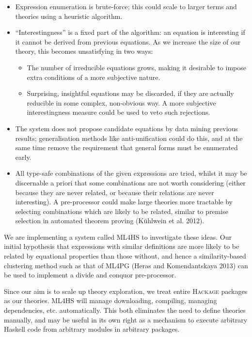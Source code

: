 \documentclass[]{article}
\providecommand{\tightlist}{%
  \setlength{\itemsep}{0pt}\setlength{\parskip}{0pt}}
\begin{document}
\begin{itemize}
\tightlist
\item
  Expression enumeration is brute-force; this could scale to larger
  terms and theories using a heuristic algorithm.
\item
  ``Interestingness'' is a fixed part of the algorithm: an equation is
  interesting if it cannot be derived from previous equations. As we
  increase the size of our theory, this becomes unsatisfying in two
  ways:

  \begin{itemize}
  \tightlist
  \item
    The number of irreducible equations grows, making it desirable to
    impose extra conditions of a more subjective nature.
  \item
    Surprising, insightful equations may be discarded, if they are
    actually reducible in some complex, non-obvious way. A more
    subjective interestingness measure could be used to veto such
    rejections.
  \end{itemize}
\item
  The system does not propose candidate equations by data mining
  previous results; generalisation methods like anti-unification could
  do this, and at the same time remove the requirement that general
  forms must be enumerated early.
\item
  All type-safe combinations of the given expressions are tried, whilst
  it may be discernable a priori that some combinations are not worth
  considering (either because they are never related, or because their
  relations are never interesting). A pre-processor could make large
  theories more tractable by selecting combinations which are likely to
  be related, similar to premise selection in automated theorem proving
  (Kühlwein et al. 2012).
\end{itemize}

We are implementing a system called \textsc{ML4HS} to investigate these
ideas. Our initial hypothesis that expressions with similar definitions
are more likely to be related by equational properties than those
without, and hence a similarity-based clustering method such as that of
\textsc{ML4PG} (Heras and Komendantskaya 2013) can be used to implement
a divide and conquor pre-processor.

Since our aim is to scale up theory exploration, we treat entire
\textsc{Hackage} packages as our theories. \textsc{ML4HS} will manage
downloading, compiling, managing dependencies, etc. automatically. This
both eliminates the need to define theories manually, and may be useful
in its own right as a mechanism to execute arbitrary Haskell code from
arbitrary modules in arbitrary packages.
\end{document}
